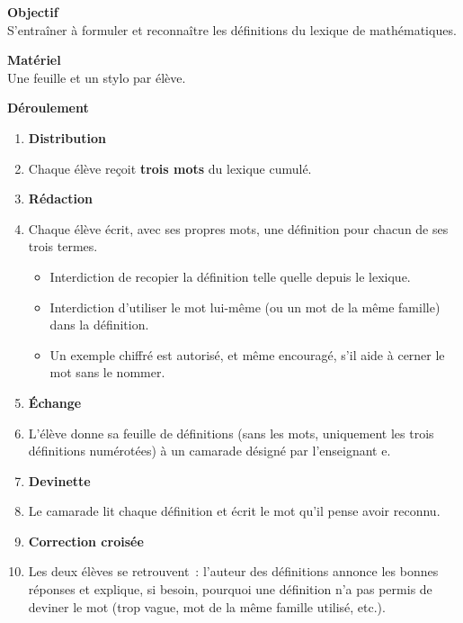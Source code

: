 

\textcolor{themeColor}{\textbf{Objectif}}\\
S'entraîner à formuler et reconnaître les définitions du lexique de
mathématiques.

\vspace{20pt}
\textcolor{themeColor}{\textbf{Matériel}}\\
Une feuille et un stylo par élève.

\vspace{20pt}
\textcolor{themeColor}{\textbf{\large Déroulement}}
\begin{enumerate}[leftmargin=*]
\item \textbf{Distribution}
\item[] Chaque élève reçoit \textbf{trois mots} du lexique cumulé.
\medskip
\item \textbf{Rédaction}
\item[]Chaque élève écrit, avec ses propres mots, une définition pour chacun de ses trois termes.
\begin{itemize}[leftmargin=1.2em,label=$\triangleright$]
\item Interdiction de recopier la définition telle quelle depuis le lexique.
\item Interdiction d'utiliser le mot lui-même (ou un mot de la même famille) dans la définition.
\item Un exemple chiffré est autorisé, et même encouragé, s'il aide à cerner le mot sans le nommer.
\end{itemize}
\medskip
\item \textbf{Échange}
\item[]L'élève donne sa feuille de définitions (sans les mots, uniquement les trois définitions numérotées) à un camarade désigné par l'enseignant\,\textperiodcentered\,e.
\item \textbf{Devinette}
\item[] Le camarade lit chaque définition et écrit le mot qu'il pense avoir reconnu.
\item \textbf{Correction croisée}
\item[] Les deux élèves se retrouvent~: l'auteur des définitions annonce les bonnes réponses et explique, si besoin, pourquoi une définition n'a pas permis de deviner le mot (trop vague, mot de la même famille utilisé, etc.).
\end{enumerate}

